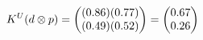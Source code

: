 \documentclass[preview]{standalone}
\begin{document}
\begin{align*}
\special{dvisvgm:raw <g id='unique000'>}K^U(d \otimes p) = \begin{pmatrix} (0.86)(0.77) \\ (0.49)(0.52) \end{pmatrix} = \begin{pmatrix} 0.67 \\ 0.26 \end{pmatrix}\special{dvisvgm:raw </g>}
\end{align*}
\end{document}
